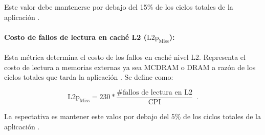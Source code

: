 Este valor debe mantenerse por debajo del 15\% de los ciclos totales de la aplicaci\'on \cite{Jeffers2016315}.


\paragraph*{Costo de fallos de lectura en cach\'e L2 ($\text{L2p}_{\text{Miss}}$):}

Esta m\'etrica determina el costo de los fallos en cach\'e nivel L2. Representa el costo de lectura a memorias externas ya sea MCDRAM o DRAM a raz\'on de los ciclos totales que tarda la aplicaci\'on \cite{Jeffers2016315}. Se define como:

\begin{equation}
\text{L2p}_\text{Miss} = 230 *\frac{\text{\# fallos de lectura en L2}}{\text{CPI}} \enspace .
\end{equation}

La espectativa es mantener este valos por debajo del 5\% de los ciclos totales de la aplicaci\'on \cite{Jeffers2016315}.


